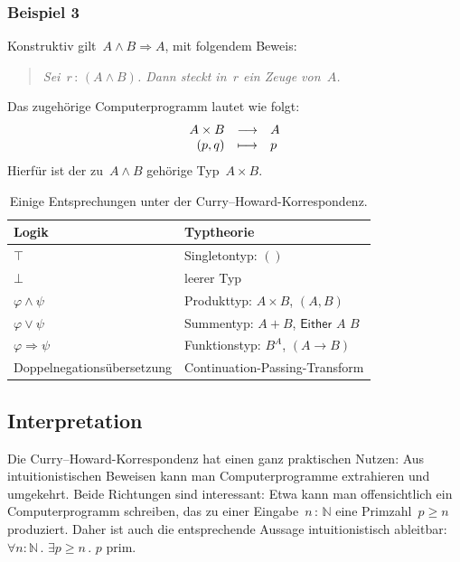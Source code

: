 \documentclass[a4paper,ngerman,12pt]{scrartcl}
\theoremstyle{definition}
\theoremstyle{plain}
\theoremstyle{remark}
\newcommand{\NN}{\mathbb{N}}
\renewcommand{\_}{\mathpunct{.}\,}
\newcommand{\?}{\,{:}\,}
\begin{document}
\subsubsection*{Beispiel 3}

Konstruktiv gilt~$A \wedge B \Rightarrow A$, mit folgendem Beweis:
\begin{quote}\emph{Sei~$r\?(A \wedge B)$. Dann steckt in~$r$ ein Zeuge
von~$A$.}\end{quote}
Das zugehörige Computerprogramm lautet wie folgt:
\[ \begin{array}{@{}rcl@{}}
  A \times B &\longrightarrow& A \\
  (p,q) &\longmapsto& p
\end{array} \]
Hierfür ist der zu~$A \wedge B$ gehörige Typ~$A \times B$.

\begin{table}
  \centering
  \small
  \begin{tabular}{@{}ll@{}}
    \toprule
    Logik & Typtheorie \\\midrule
    $\top$ & Singletontyp: $()$ \\
    $\bot$ & leerer Typ \\
    $\varphi \wedge \psi$ & Produkttyp: $A \times B$, $(A,B)$ \\
    $\varphi \vee \psi$ & Summentyp: $A + B$, $\mathsf{Either}$ $A$ $B$ \\
    $\varphi \Rightarrow \psi$ & Funktionstyp: $B^A$, $(A \to B)$ \\
    Doppelnegationsübersetzung & Continuation-Passing-Transform
    \\
    \bottomrule
  \end{tabular}
  \caption{\label{tafel:curry-howard}Einige Entsprechungen unter der
  Curry--Howard-Korrespondenz.}
\end{table}


\subsection{Interpretation}

Die Curry--Howard-Korrespondenz hat einen ganz praktischen Nutzen: Aus
intuitionistischen Beweisen kann man Computerprogramme extrahieren und
umgekehrt. Beide Richtungen sind interessant: Etwa kann man offensichtlich ein
Computerprogramm schreiben, das zu einer Eingabe~$n \? \NN$ eine Primzahl~$p
\geq n$ produziert. Daher ist auch die entsprechende Aussage intuitionistisch
ableitbar:~$\forall n{:}\NN\_ \exists p \geq n\_ \text{$p$ prim}$.
\end{document}
